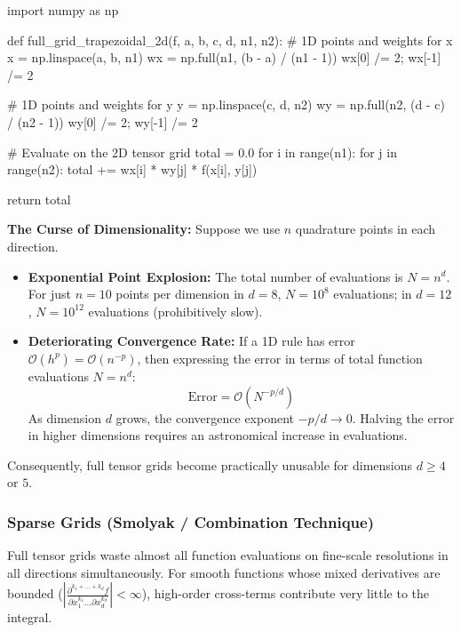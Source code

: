 \begin{codeexample}
import numpy as np

def full_grid_trapezoidal_2d(f, a, b, c, d, n1, n2):
    # 1D points and weights for x
    x = np.linspace(a, b, n1)
    wx = np.full(n1, (b - a) / (n1 - 1))
    wx[0] /= 2; wx[-1] /= 2
    
    # 1D points and weights for y
    y = np.linspace(c, d, n2)
    wy = np.full(n2, (d - c) / (n2 - 1))
    wy[0] /= 2; wy[-1] /= 2
    
    # Evaluate on the 2D tensor grid
    total = 0.0
    for i in range(n1):
        for j in range(n2):
            total += wx[i] * wy[j] * f(x[i], y[j])
            
    return total
\end{codeexample}

\begin{important}
    \textbf{The Curse of Dimensionality:} Suppose we use $n$ quadrature points in each direction.
    \begin{itemize}
        \item \textbf{Exponential Point Explosion:} The total number of evaluations is $N = n^d$. For just $n = 10$ points per dimension in $d = 8$, $N = 10^8$ evaluations; in $d = 12$, $N = 10^{12}$ evaluations (prohibitively slow).
        \item \textbf{Deteriorating Convergence Rate:} If a 1D rule has error $\mathcal{O}(h^p) = \mathcal{O}(n^{-p})$, then expressing the error in terms of total function evaluations $N = n^d$:
        $$\text{Error} = \mathcal{O}\left(N^{-p/d}\right)$$
        As dimension $d$ grows, the convergence exponent $-p/d \to 0$. Halving the error in higher dimensions requires an astronomical increase in evaluations.
    \end{itemize}
    Consequently, full tensor grids become practically unusable for dimensions $d \ge 4$ or $5$.
\end{important}

\subsubsection{Sparse Grids (Smolyak / Combination Technique)}

\begin{remark}
    Full tensor grids waste almost all function evaluations on fine-scale resolutions in all directions simultaneously.
    For smooth functions whose mixed derivatives are bounded ($\left| \frac{\partial^{k_1 + \dots + k_d} f}{\partial x_1^{k_1} \dots \partial x_d^{k_d}} \right| < \infty$), high-order cross-terms contribute very little to the integral.
\end{remark}

